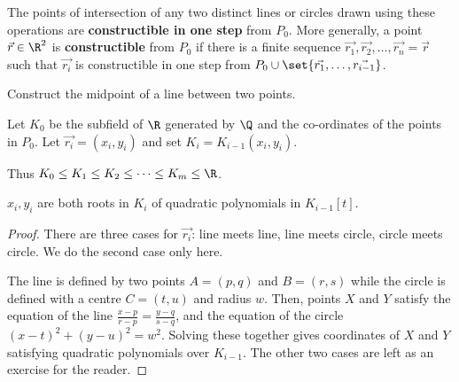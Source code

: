 \documentclass{article}
\begin{document}
\begin{ndef}
    The points of intersection of any two distinct lines or circles drawn using these operations are \textbf{constructible in one step} from $P_0$.
    More generally, a point $\vec{r} \in \R^2$ is \textbf{constructible} from $P_0$ if there is a finite sequence $\vec{r_1}, \vec{r_2}, \dotsc, \vec{r_n} = \vec{r}$ such that $\vec{r_i}$ is constructible in one step from $P_0 \cup \set{\vec{r_1}, \dotsc, \vec{r_{i-1}}}$.
\end{ndef}

\begin{exercise}
    Construct the midpoint of a line between two points.
\end{exercise}

Let $K_0$ be the subfield of $\R$ generated by $\Q$ and the co-ordinates of the points in $P_0$. Let $\vec{r_i} = (x_i, y_i)$ and set \hyperlink{def:genField}{$K_i = K_{i-1} (x_i, y_i)$}.

Thus $K_0 \leq K_1 \leq K_2 \leq \dots \leq K_m \leq \R$.

\begin{nlemma}
    $x_i, y_i$ are both roots in $K_i$ of quadratic polynomials in $K_{i-1}[t]$.
\end{nlemma}



\begin{proof}
    There are three cases for $\vec{r_i}$: line meets line, line meets circle, circle meets circle. We do the second case only here.
    \begin{center}
    \end{center}
    The line is defined by two points $A = (p, q)$ and $B = (r, s)$ while the circle is defined with a centre $C = (t, u)$ and radius $w$.
    Then, points $X$ and $Y$ satisfy the equation of the line $\frac{x-p}{r-p} = \frac{y-q}{s-q}$, and the equation of the circle $(x-t)^2 + (y-u)^2 = w^2$.
    Solving these together gives coordinates of $X$ and $Y$ satisfying quadratic polynomials over $K_{i-1}$.
    The other two cases are left as an exercise for the reader.
\end{proof}
\end{document}
